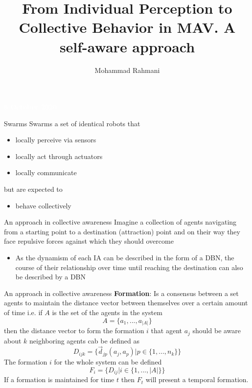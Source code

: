 \documentclass[unknownkeysallowed]{beamer}
\title{From Individual Perception to Collective Behavior in MAV. A self-aware approach}
\author{Mohammad Rahmani}
\institute{Pervasive Computing Group}
\begin{document}
	\begin{frame}
		\date{}
		\maketitle
		\textcolor{white}{\textbf{6 October 2020}}
	\end{frame}
	
	\begin{frame}{Swarms}
		Swarms a set of identical robots that
		\begin{itemize}
			\item locally perceive via sensors
			\item locally act through actuators
			\item locally communicate
		\end{itemize}
		but are expected to 
		\begin{itemize}
			\item behave collectively
		\end{itemize}
	\end{frame}

	\begin{frame}{An approach in collective awareness}
	Imagine a collection of agents navigating from a starting point to a destination (attraction) point and on their way they face repulsive forces against which they should overcome
		\begin{itemize}
			\item As the dynamism of each IA can be described in the form of a DBN, the course of their relationship over time until reaching the destination can also be described by a DBN
		\end{itemize}
	\end{frame}

	\begin{frame}{An approach in collective awareness}
		\textbf{Formation}: Is a consensus between a set agents to maintain the distance vector between themselves over a certain amount of time i.e. if $A$ is the set of the agents in the system
		\begin{equation}
		A = \{a_1,...,a_{|A|}\}
		\end{equation}
		then the distance vector to form the formation $i$ that agent $a_j$ should be aware about $k$ neighboring agents cab be defined as 
		\begin{equation}
		D_{ijk} = \{\vec{d}_{jp}(a_j,a_p)|p\in \{1,...,n_k\}\} 
		\end{equation}
		The formation $i$ for the whole system can be defined
		\begin{equation}
		F_i = \{D_{ij}|i\in\{1,...,|A|\}\}
		\end{equation}
		If a formation is maintained for time $t$ then $F_t$ will present a temporal formation. 
	\end{frame}
\end{document}
